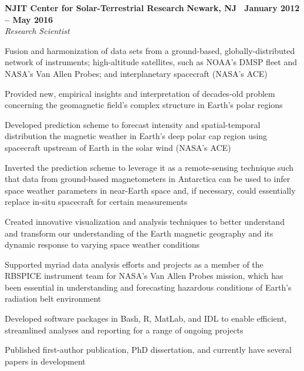 \documentclass[10pt]{article}
\newcommand{\leftandright}[2]{\noindent\textbf{#1}\hfill
\textbf{#2}}
\begin{document}
\leftandright{NJIT Center for Solar-Terrestrial Research}{Newark, NJ \textbullet\, January
2012 -- May 2016} \\  
\vspace{-0.8em}
\textit{Research Scientist} 
\begin{itemize*}
  \item Fusion and harmonization of data sets from a ground-based,
    globally-distributed network of instruments; high-altitude 
    satellites, such as NOAA's DMSP fleet and NASA's Van Allen
    Probes; and interplanetary spacecraft (NASA's ACE)
  \item Provided new, empirical insights and interpretation of
    decades-old problem concerning the geomagnetic field's complex
    structure in Earth's polar regions
  \item Developed prediction scheme to forecast intensity and
    spatial-temporal distribution the magnetic weather
    in Earth's deep polar cap region using spacecraft upstream of Earth in the
    solar wind (NASA's ACE) 
  \item Inverted the prediction scheme to leverage it as a remote-sensing technique 
    such that data from ground-based magnetometers in Antarctica can
    be used to infer space weather parameters in near-Earth space and,
    if necessary, could essentially replace in-situ spacecraft for certain measurements
  \item Created innovative visualization and analysis techniques
    to better understand and transform our understanding of the 
    Earth magnetic geography and its dynamic response to varying
    space weather conditions
  \item  Supported myriad data analysis efforts and projects as a member
    of the RBSPICE instrument team for NASA's Van Allen
    Probes mission, which has been essential in understanding and
    forecasting hazardous conditions of Earth's radiation belt
    environment
  \item Developed software packages in Bash, R, MatLab, and IDL to enable efficient, 
    streamlined analyses and reporting for a range of ongoing projects 
  \item Published first-author publication, PhD dissertation, and
    currently have several papers in development

\end{itemize*}
\end{document}

